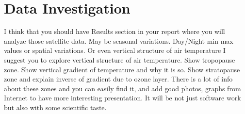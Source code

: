 \documentclass[../00_main.tex]{subfiles}
\begin{document}
\section{Data Investigation}

I think that you should have Results section in your report where you will
analyze those satellite data. May be seasonal variations. Day/Night min max
values or spatial variations. Or even vertical structure of air temperature
I suggest you to explore vertical structure of air temperature. Show tropopause
zone. Show vertical gradient of temperature and why it is so. Show stratopause
zone and explain inverse of gradient due to ozone layer. There is a lot of info
about these zones and you can easily find it, and add good photos, graphs from
Internet to have more interesting presentation. It will be not just software
work but also with some scientific taste.
\end{document}
